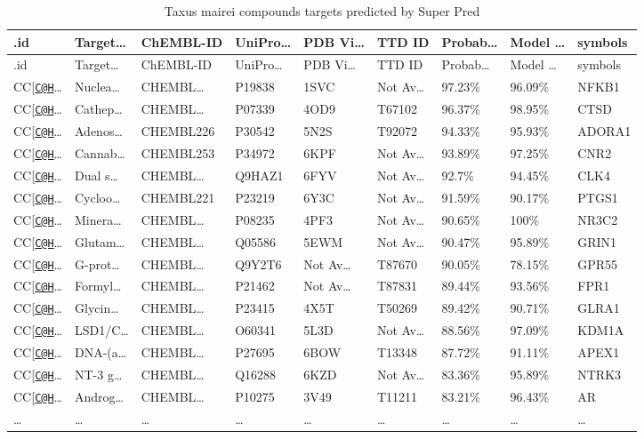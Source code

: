 \documentclass[
]{article}
\begin{document}
\begin{longtable}[]{@{}lllllllll@{}}
\caption{\label{tab:Taxus-mairei-compounds-targets-predicted-by-Super-Pred}Taxus mairei compounds targets predicted by Super Pred}\tabularnewline
\toprule
.id & Target\ldots{} & ChEMBL-ID & UniPro\ldots{} & PDB Vi\ldots{} & TTD ID & Probab\ldots{} & Model \ldots{} & symbols\tabularnewline
\midrule
\endfirsthead
\toprule
.id & Target\ldots{} & ChEMBL-ID & UniPro\ldots{} & PDB Vi\ldots{} & TTD ID & Probab\ldots{} & Model \ldots{} & symbols\tabularnewline
\midrule
\endhead
CC{[}\href{mailto:C@H}{\nolinkurl{C@H}}\ldots{} & Nuclea\ldots{} & CHEMBL\ldots{} & P19838 & 1SVC & Not Av\ldots{} & 97.23\% & 96.09\% & NFKB1\tabularnewline
CC{[}\href{mailto:C@H}{\nolinkurl{C@H}}\ldots{} & Cathep\ldots{} & CHEMBL\ldots{} & P07339 & 4OD9 & T67102 & 96.37\% & 98.95\% & CTSD\tabularnewline
CC{[}\href{mailto:C@H}{\nolinkurl{C@H}}\ldots{} & Adenos\ldots{} & CHEMBL226 & P30542 & 5N2S & T92072 & 94.33\% & 95.93\% & ADORA1\tabularnewline
CC{[}\href{mailto:C@H}{\nolinkurl{C@H}}\ldots{} & Cannab\ldots{} & CHEMBL253 & P34972 & 6KPF & Not Av\ldots{} & 93.89\% & 97.25\% & CNR2\tabularnewline
CC{[}\href{mailto:C@H}{\nolinkurl{C@H}}\ldots{} & Dual s\ldots{} & CHEMBL\ldots{} & Q9HAZ1 & 6FYV & Not Av\ldots{} & 92.7\% & 94.45\% & CLK4\tabularnewline
CC{[}\href{mailto:C@H}{\nolinkurl{C@H}}\ldots{} & Cycloo\ldots{} & CHEMBL221 & P23219 & 6Y3C & Not Av\ldots{} & 91.59\% & 90.17\% & PTGS1\tabularnewline
CC{[}\href{mailto:C@H}{\nolinkurl{C@H}}\ldots{} & Minera\ldots{} & CHEMBL\ldots{} & P08235 & 4PF3 & Not Av\ldots{} & 90.65\% & 100\% & NR3C2\tabularnewline
CC{[}\href{mailto:C@H}{\nolinkurl{C@H}}\ldots{} & Glutam\ldots{} & CHEMBL\ldots{} & Q05586 & 5EWM & Not Av\ldots{} & 90.47\% & 95.89\% & GRIN1\tabularnewline
CC{[}\href{mailto:C@H}{\nolinkurl{C@H}}\ldots{} & G-prot\ldots{} & CHEMBL\ldots{} & Q9Y2T6 & Not Av\ldots{} & T87670 & 90.05\% & 78.15\% & GPR55\tabularnewline
CC{[}\href{mailto:C@H}{\nolinkurl{C@H}}\ldots{} & Formyl\ldots{} & CHEMBL\ldots{} & P21462 & Not Av\ldots{} & T87831 & 89.44\% & 93.56\% & FPR1\tabularnewline
CC{[}\href{mailto:C@H}{\nolinkurl{C@H}}\ldots{} & Glycin\ldots{} & CHEMBL\ldots{} & P23415 & 4X5T & T50269 & 89.42\% & 90.71\% & GLRA1\tabularnewline
CC{[}\href{mailto:C@H}{\nolinkurl{C@H}}\ldots{} & LSD1/C\ldots{} & CHEMBL\ldots{} & O60341 & 5L3D & Not Av\ldots{} & 88.56\% & 97.09\% & KDM1A\tabularnewline
CC{[}\href{mailto:C@H}{\nolinkurl{C@H}}\ldots{} & DNA-(a\ldots{} & CHEMBL\ldots{} & P27695 & 6BOW & T13348 & 87.72\% & 91.11\% & APEX1\tabularnewline
CC{[}\href{mailto:C@H}{\nolinkurl{C@H}}\ldots{} & NT-3 g\ldots{} & CHEMBL\ldots{} & Q16288 & 6KZD & Not Av\ldots{} & 83.36\% & 95.89\% & NTRK3\tabularnewline
CC{[}\href{mailto:C@H}{\nolinkurl{C@H}}\ldots{} & Androg\ldots{} & CHEMBL\ldots{} & P10275 & 3V49 & T11211 & 83.21\% & 96.43\% & AR\tabularnewline
\ldots{} & \ldots{} & \ldots{} & \ldots{} & \ldots{} & \ldots{} & \ldots{} & \ldots{} & \ldots{}\tabularnewline
\bottomrule
\end{longtable}
\end{document}
